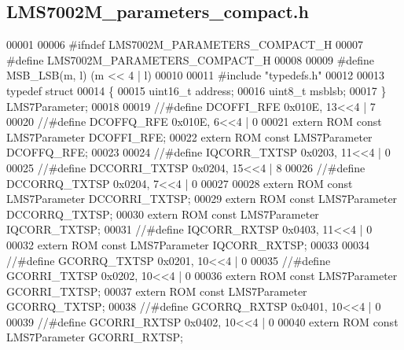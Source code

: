 \subsection{L\+M\+S7002\+M\+\_\+parameters\+\_\+compact.\+h}
\label{LMS7002M__parameters__compact_8h_source}

\begin{DoxyCode}
00001 
00006 \textcolor{preprocessor}{#ifndef LMS7002M\_PARAMETERS\_COMPACT\_H}
00007 \textcolor{preprocessor}{#define LMS7002M\_PARAMETERS\_COMPACT\_H}
00008 
00009 \textcolor{preprocessor}{#define MSB\_LSB(m, l) (m << 4 | l)}
00010 
00011 \textcolor{preprocessor}{#include "typedefs.h"}
00012 
00013 \textcolor{keyword}{typedef} \textcolor{keyword}{struct}
00014 \{
00015     uint16\_t address;
00016     uint8\_t msblsb;
00017 \} LMS7Parameter;
00018 
00019 \textcolor{comment}{//#define DCOFFI\_RFE 0x010E, 13<<4 |  7}
00020 \textcolor{comment}{//#define DCOFFQ\_RFE 0x010E, 6<<4 |  0}
00021 \textcolor{keyword}{extern} ROM \textcolor{keyword}{const} LMS7Parameter DCOFFI_RFE;
00022 \textcolor{keyword}{extern} ROM \textcolor{keyword}{const} LMS7Parameter DCOFFQ_RFE;
00023 
00024 \textcolor{comment}{//#define IQCORR\_TXTSP 0x0203, 11<<4 |  0}
00025 \textcolor{comment}{//#define DCCORRI\_TXTSP 0x0204, 15<<4 |  8}
00026 \textcolor{comment}{//#define DCCORRQ\_TXTSP 0x0204, 7<<4 |  0}
00027 
00028 \textcolor{keyword}{extern} ROM \textcolor{keyword}{const} LMS7Parameter DCCORRI_TXTSP;
00029 \textcolor{keyword}{extern} ROM \textcolor{keyword}{const} LMS7Parameter DCCORRQ_TXTSP;
00030 \textcolor{keyword}{extern} ROM \textcolor{keyword}{const} LMS7Parameter IQCORR_TXTSP;
00031 \textcolor{comment}{//#define IQCORR\_RXTSP 0x0403, 11<<4 |  0}
00032 \textcolor{keyword}{extern} ROM \textcolor{keyword}{const} LMS7Parameter IQCORR_RXTSP;
00033 
00034 \textcolor{comment}{//#define GCORRQ\_TXTSP 0x0201, 10<<4 |  0}
00035 \textcolor{comment}{//#define GCORRI\_TXTSP 0x0202, 10<<4 |  0}
00036 \textcolor{keyword}{extern} ROM \textcolor{keyword}{const} LMS7Parameter GCORRI_TXTSP;
00037 \textcolor{keyword}{extern} ROM \textcolor{keyword}{const} LMS7Parameter GCORRQ_TXTSP;
00038 \textcolor{comment}{//#define GCORRQ\_RXTSP 0x0401, 10<<4 |  0}
00039 \textcolor{comment}{//#define GCORRI\_RXTSP 0x0402, 10<<4 |  0}
00040 \textcolor{keyword}{extern} ROM \textcolor{keyword}{const} LMS7Parameter GCORRI_RXTSP;

\end{DoxyCode}
